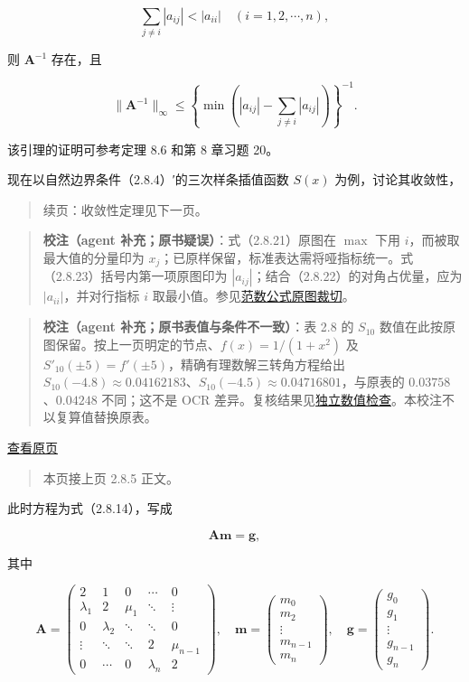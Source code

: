 \documentclass[
  10pt,
  fontset=fandol]{ctexart}
\begin{document}
\[\sum_{j\ne i}|a_{ij}|<|a_{ii}|\quad(i=1,2,\cdots,n),\tag{2.8.22}\]

则 \(\boldsymbol A^{-1}\) 存在，且

\[\|\boldsymbol A^{-1}\|_\infty\leqslant\left\{\min\left(|a_{ij}|-\sum_{j\ne i}|a_{ij}|\right)\right\}^{-1}.\tag{2.8.23}\]

该引理的证明可参考定理 8.6 和第 8 章习题 20。

现在以自然边界条件（2.8.4）′的三次样条插值函数 \(S(x)\) 为例，讨论其收敛性，

\begin{quote}
续页：收敛性定理见下一页。
\end{quote}

\begin{quote}
\textbf{校注（agent 补充；原书疑误）}：式（2.8.21）原图在 \(\max\) 下用 \(i\)，而被取最大值的分量印为 \(x_j\)；已原样保留，标准表达需将哑指标统一。式（2.8.23）括号内第一项原图印为 \(|a_{ij}|\)；结合（2.8.22）的对角占优量，应为 \(|a_{ii}|\)，并对行指标 \(i\) 取最小值。参见\href{../assets/ch02b/pdf-054-norm-detail.png}{范数公式原图裁切}。
\end{quote}

\begin{quote}
\textbf{校注（agent 补充；原书表值与条件不一致）}：表 2.8 的 \(S_{10}\) 数值在此按原图保留。按上一页明定的节点、\(f(x)=1/(1+x^2)\) 及 \(S'_{10}(\pm5)=f'(\pm5)\)，精确有理数解三转角方程给出 \(S_{10}(-4.8)\approx0.04162183\)、\(S_{10}(-4.5)\approx0.04716801\)，与原表的 \(0.03758\)、\(0.04248\) 不同；这不是 OCR 差异。复核结果见\href{../../staging/ch02b/table-2-8-check.txt}{独立数值检查}。本校注不以复算值替换原表。
\end{quote}

\href{../../source-images/pdf-055.jpeg}{查看原页}

\begin{quote}
本页接上页 2.8.5 正文。
\end{quote}

此时方程为式（2.8.14），写成

\[\boldsymbol A\boldsymbol m=\boldsymbol g,\tag{2.8.24}\]

其中

\[\boldsymbol A=\begin{pmatrix}
2&1&0&\cdots&0\\
\lambda_1&2&\mu_1&\ddots&\vdots\\
0&\lambda_2&\ddots&\ddots&0\\
\vdots&\ddots&\ddots&2&\mu_{n-1}\\
0&\cdots&0&\lambda_n&2
\end{pmatrix},\quad
\boldsymbol m=\begin{pmatrix}m_0\\m_2\\\vdots\\m_{n-1}\\m_n\end{pmatrix},\quad
\boldsymbol g=\begin{pmatrix}g_0\\g_1\\\vdots\\g_{n-1}\\g_n\end{pmatrix}.\]
\end{document}
